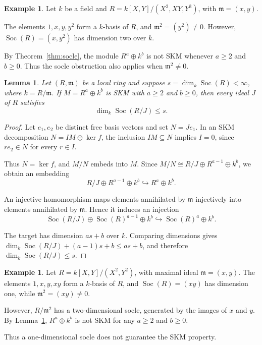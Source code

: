 \documentclass[11pt,a4paper]{article}
\newtheorem{lemma}[theorem]{Lemma}
\theoremstyle{definition}
\newtheorem{example}[theorem]{Example}
\theoremstyle{remark}
\begin{document}
\begin{example}
\label{ex:nonsquare}
Let $k$ be a field and $R=k[X,Y]/(X^2,XY,Y^3)$, with $\mathfrak m=(x,y)$.

The elements $1,x,y,y^2$ form a $k$-basis of $R$, and $\mathfrak m^2=(y^2)\ne0$. However, $\operatorname{Soc}(R)=(x,y^2)$ has dimension two over $k$.

By Theorem~\ref{thm:socle}, the module $R^a\oplus k^b$ is not SKM whenever $a\geq2$ and $b\geq0$. Thus the socle obstruction also applies when $\mathfrak m^2\ne0$.
\end{example}

\begin{lemma}
\label{lem:socbudget}
Let $(R,\mathfrak m)$ be a local ring and suppose $s=\dim_k\operatorname{Soc}(R)<\infty$, where $k=R/\mathfrak m$. If $M=R^a\oplus k^b$ is SKM with $a\geq2$ and $b\geq0$, then every ideal $J$ of $R$ satisfies
\[
\dim_k\operatorname{Soc}(R/J)\leq s.
\]
\end{lemma}

\begin{proof}
Let $e_1,e_2$ be distinct free basis vectors and set $N=Je_1$. In an SKM decomposition $N=IM\oplus\ker f$, the inclusion $IM\subseteq N$ implies $I=0$, since $re_2\in N$ for every $r\in I$.

Thus $N=\ker f$, and $M/N$ embeds into $M$. Since $M/N\cong R/J\oplus R^{a-1}\oplus k^b$, we obtain an embedding
\[
R/J\oplus R^{a-1}\oplus k^b
\hookrightarrow R^a\oplus k^b.
\]

An injective homomorphism maps elements annihilated by $\mathfrak m$ injectively into elements annihilated by $\mathfrak m$. Hence it induces an injection
\[
\operatorname{Soc}(R/J)\oplus
\operatorname{Soc}(R)^{a-1}\oplus k^b
\hookrightarrow
\operatorname{Soc}(R)^a\oplus k^b.
\]

The target has dimension $as+b$ over $k$. Comparing dimensions gives
$\dim_k\operatorname{Soc}(R/J)+(a-1)s+b\leq as+b$,
and therefore $\dim_k\operatorname{Soc}(R/J)\leq s$.
\end{proof}

\begin{example}
\label{ex:onesocle}
Let $R=k[X,Y]/(X^2,Y^2)$, with maximal ideal
$\mathfrak m=(x,y)$. The elements $1,x,y,xy$ form
a $k$-basis of $R$, and
$\operatorname{Soc}(R)=(xy)$ has dimension one,
while $\mathfrak m^2=(xy)\ne0$.

However, $R/\mathfrak m^2$ has a two-dimensional
socle, generated by the images of $x$ and $y$.
By Lemma~\ref{lem:socbudget}, $R^a\oplus k^b$
is not SKM for any $a\geq2$ and $b\geq0$.

Thus a one-dimensional socle does not guarantee
the SKM property.
\end{example}
\end{document}
